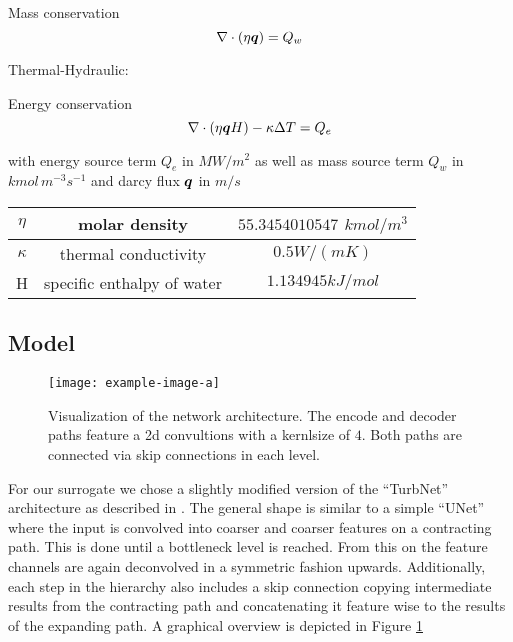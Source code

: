 \documentclass{article} %
\begin{document}
Mass conservation
\begin{equation}
   \label{eq:mass}
   \nabla \cdot \left(\eta {\bm{q}} \right) = Q_w
\end{equation}

Thermal-Hydraulic:

Energy conservation
\begin{equation}
   \label{eq:energy}
   \nabla \cdot \left(\eta {\bm{q}} H\right) - \kappa \Delta T = Q_e
\end{equation}

with energy source term $Q_e$ in $MW/m^2$ as well as mass source term $Q_w$ in $kmol\, m^{-3} s^{-1}$ and darcy flux ${\bm{q}}$ in $m/s$

\begin{tabular}{| c | c | c |}
   \hline
   $\eta$   & molar density        & $55.3454010547$ $kmol/m^3$ \\
   \hline
   $\kappa$ & thermal conductivity & $0.5 W/(mK)$                   \\
   \hline
   H        & specific enthalpy of water             & $1.134945 kJ/mol$                  \\
   \hline
\end{tabular}




\subsection*{Model}
\begin{figure}[htb]
   \centering
   \texttt{[image: example-image-a]}
   \caption{Visualization of the network architecture. The encode and decoder paths feature a 2d convultions with a kernlsize of $4$. Both paths are connected via skip connections in each level.}
   \label{fig:arch}
\end{figure}

For our surrogate we chose a slightly modified version of the ``TurbNet'' architecture as described in \cite{turbnet}.
The general shape is similar to a simple ``UNet'' \cite{unet} where the input is convolved into coarser and coarser features on a contracting path.
This is done until a bottleneck level is reached.
From this on the feature channels are again deconvolved in a symmetric fashion upwards.
Additionally, each step in the hierarchy also includes a skip connection copying intermediate results from the contracting path and concatenating it feature wise to the results of the expanding path.
A graphical overview is depicted in Figure \ref{fig:arch}
\end{document}
